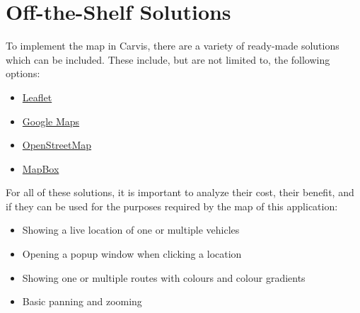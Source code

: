 \chapter{Off-the-Shelf Solutions}
To implement the map in Carvis, there are a variety of ready-made solutions which can be included.
These include, but are not limited to, the following options:
\begin{itemize}
    \item \href{https://leafletjs.com/}{Leaflet}
    \item \href{https://developers.google.com/maps/apis-by-platform}{Google Maps}
    \item \href{https://wiki.openstreetmap.org/wiki/API_v0.6}{OpenStreetMap}
    \item \href{https://www.mapbox.com/}{MapBox}
\end{itemize}

For all of these solutions, it is important to analyze their cost, their benefit, and if they can be used for the purposes required by the map of this application:
\begin{itemize}
    \item Showing a live location of one or multiple vehicles
    \item Opening a popup window when clicking a location
    \item Showing one or multiple routes with colours and colour gradients
    \item Basic panning and zooming
\end{itemize}